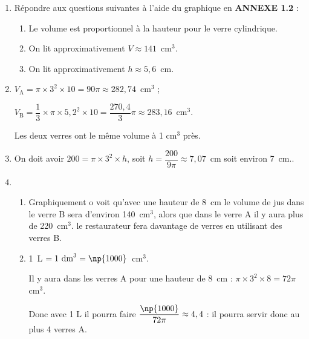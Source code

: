 \begin{enumerate}
\item Répondre aux questions suivantes à l'aide du graphique en \textbf{ANNEXE 1.2} :
	\begin{enumerate}
		\item %
Le volume est proportionnel à la hauteur pour le verre cylindrique.
		\item %
On lit approximativement $V \approx 141$~cm$^3$.
		\item %
On lit approximativement $h \approx 5,6$~cm.
 	\end{enumerate}
\item  %
$V_{\text{A}} = \pi \times 3^2 \times 10 = 90\pi \approx 282,74$~cm$^3$ ;

$V_{\text{B}} = \dfrac{1}{3} \times \pi \times 5,2^2 \times 10 = \dfrac{270,4}{3}\pi \approx 283,16$~cm$^3$.

Les deux verres ont le même volume à 1 cm$^3$ près. 
\item %
On doit avoir $200 = \pi \times 3^2 \times h$, soit $h = \dfrac{200}{9\pi} \approx 7,07$~cm soit environ 7~cm..
\item  %
	\begin{enumerate}
		\item %
		Graphiquement o voit qu'avec une hauteur de 8~cm le volume de jus dans le verre B sera d'environ 140~cm$^3$, alors que dans le verre A il y aura plus de 220~cm$^3$. le restaurateur fera davantage de verres en utilisant des verres B.
		\item %
1~L $  = 1~\text{dm}^3 = \np{1000}$~cm$^3$.

Il y aura dans les verres A pour une hauteur de 8~cm : $\pi \times 3^2 \times 8 = 72 \pi$cm$^3$.

Donc avec 1 L il pourra faire $\dfrac{\np{1000}}{72\pi} \approx 4,4$ : il pourra servir donc au plus 4 verres A.
	\end{enumerate}
\end{enumerate}
